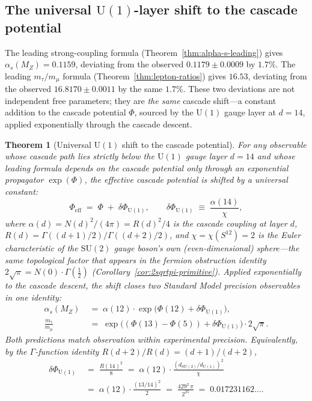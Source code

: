\documentclass[12pt,a4paper]{article}
\newtheorem{theorem}{Theorem}[section]
\begin{document}
\subsection{The universal \texorpdfstring{$\mathrm{U}(1)$}{U(1)}-layer shift to the cascade potential}

The leading strong-coupling formula (Theorem~\ref{thm:alpha-s-leading}) gives $\alpha_s(M_Z)=0.1159$, deviating from the observed $0.1179\pm 0.0009$ by $1.7\%$. The leading $m_\tau/m_\mu$ formula (Theorem~\ref{thm:lepton-ratios}) gives $16.53$, deviating from the observed $16.8170\pm 0.0011$ by the same $1.7\%$. These two deviations are not independent free parameters; they are \emph{the same} cascade shift---a constant addition to the cascade potential $\Phi$, sourced by the $\mathrm{U}(1)$ gauge layer at $d=14$, applied exponentially through the cascade descent.

\begin{theorem}[Universal $\mathrm{U}(1)$ shift to the cascade potential]\label{thm:alpha-s-closure}
For any observable whose cascade path lies strictly below the $\mathrm{U}(1)$ gauge layer $d=14$ and whose leading formula depends on the cascade potential only through an exponential propagator $\exp(\Phi)$, the effective cascade potential is shifted by a universal constant:
\begin{equation}\label{eq:u1-shift}
\Phi_{\mathrm{eff}} \;=\; \Phi \;+\; \delta\Phi_{\mathrm{U}(1)}, \qquad \delta\Phi_{\mathrm{U}(1)} \;\equiv\; \frac{\alpha(14)}{\chi},
\end{equation}
where $\alpha(d)=N(d)^2/(4\pi)=R(d)^2/4$ is the cascade coupling at layer $d$, $R(d)=\Gamma((d+1)/2)/\Gamma((d+2)/2)$, and $\chi=\chi(S^{12})=2$ is the Euler characteristic of the $\mathrm{SU}(2)$ gauge boson's own (even-dimensional) sphere---the same topological factor that appears in the fermion obstruction identity $2\sqrt{\pi}=N(0)\cdot\Gamma(\tfrac{1}{2})$ (Corollary~\ref{cor:2sqrtpi-primitive}). Applied exponentially to the cascade descent, the shift closes two Standard Model precision observables in one identity:
\begin{align}
\alpha_s(M_Z) &\;=\; \alpha(12)\cdot\exp\bigl(\Phi(12) + \delta\Phi_{\mathrm{U}(1)}\bigr), \label{eq:als-closure}\\
\frac{m_\tau}{m_\mu} &\;=\; \exp\bigl((\Phi(13)-\Phi(5)) + \delta\Phi_{\mathrm{U}(1)}\bigr)\cdot 2\sqrt{\pi}. \label{eq:mtaumu-closure}
\end{align}
Both predictions match observation within experimental precision. Equivalently, by the $\Gamma$-function identity $R(d+2)/R(d)=(d+1)/(d+2)$,
\begin{equation}\label{eq:u1-shift-equiv}
\begin{aligned}
\delta\Phi_{\mathrm{U}(1)} &\;=\; \frac{R(14)^2}{8} \;=\; \alpha(12)\cdot\frac{(d_{\mathrm{SU}(2)}/d_{\mathrm{U}(1)})^2}{\chi} \\
&\;=\; \alpha(12)\cdot\frac{(13/14)^2}{2} \;=\; \frac{429^2\,\pi}{2^{25}} \;=\; 0.017231162\ldots.
\end{aligned}
\end{equation}
\end{theorem}
\end{document}
